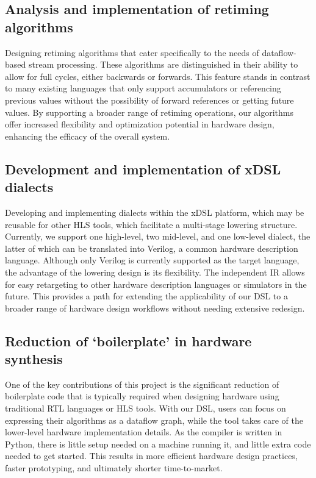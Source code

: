 \subsection*{Analysis and implementation of retiming algorithms}
Designing retiming algorithms that cater specifically to the needs of dataflow-based stream processing. These algorithms are distinguished in their ability to allow for full cycles, either backwards or forwards. This feature stands in contrast to many existing languages that only support accumulators or referencing previous values without the possibility of forward references or getting future values. By supporting a broader range of retiming operations, our algorithms offer increased flexibility and optimization potential in hardware design, enhancing the efficacy of the overall system.

\subsection*{Development and implementation of xDSL dialects}
Developing and implementing dialects within the xDSL platform, which may be reusable for other HLS tools, which facilitate a multi-stage lowering structure. Currently, we support one high-level, two mid-level, and one low-level dialect, the latter of which can be translated into Verilog, a common hardware description language. Although only Verilog is currently supported as the target language, the advantage of the lowering design is its flexibility. The independent IR allows for easy retargeting to other hardware description languages or simulators in the future. This provides a path for extending the applicability of our DSL to a broader range of hardware design workflows without needing extensive redesign.

\subsection*{Reduction of `boilerplate' in hardware synthesis}
One of the key contributions of this project is the significant reduction of boilerplate code that is typically required when designing hardware using traditional RTL languages or HLS tools. With our DSL, users can focus on expressing their algorithms as a dataflow graph, while the tool takes care of the lower-level hardware implementation details. As the compiler is written in Python, there is little setup needed on a machine running it, and little extra code needed to get started. This results in more efficient hardware design practices, faster prototyping, and ultimately shorter time-to-market.

